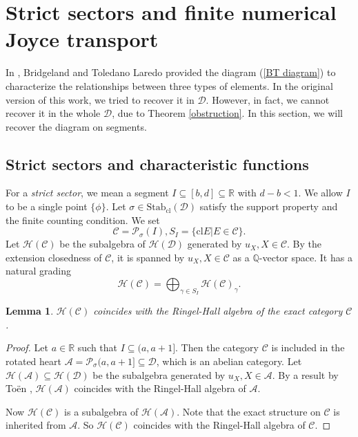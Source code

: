\documentclass[a4paper,12pt]{amsart}
\numberwithin{equation}{section}
\newtheorem{lemma}[theorem]{Lemma}
\newcommand{\Stab}{\mathrm{Stab}}
\newcommand{\cl}{\mathrm{cl}}
\newcommand{\1}{\mathbf{1}}
\begin{document}
\section{Strict sectors and finite numerical Joyce transport}
In \cite{BT2012}, Bridgeland and Toledano Laredo provided the diagram (\ref{BT diagram}) to characterize the relationships between three types of elements. In the original version \cite{GX2025} of this work, we tried to recover it in $\mathcal{D}$. However, in fact, we cannot recover it in the whole $\mathcal{D}$, due to Theorem \ref{obstruction}. In this section, we will recover the diagram on segments.
\subsection{Strict sectors and characteristic functions}
For a \emph{strict sector}, we mean a segment $I\subseteq[b,d]\subseteq\mathbb{R}$ with $d-b<1$. We allow $I$ to be a single point $\{\phi\}$. Let $\sigma\in\Stab_\cl(\mathcal{D})$ satisfy the support property and the finite counting condition. We set
\[\mathcal{C}=\mathcal{P}_\sigma(I),S_I=\{\cl E|E\in\mathcal{C}\}.\]
Let $\mathcal{H}(\mathcal{C})$ be the subalgebra of $\mathcal{H}(\mathcal{D})$ generated by $u_X,X\in\mathcal{C}$. By the extension closedness of  $\mathcal{C}$, it is spanned by $u_X,X\in\mathcal{C}$ as a $\mathbb{Q}$-vector space. It has a natural grading
\[\mathcal{H}(\mathcal{C})=\bigoplus_{\gamma\in S_I}\mathcal{H}(\mathcal{C})_\gamma.\]
\begin{lemma}\label{coincide Ringel-Hall}
    $\mathcal{H}(\mathcal{C})$ coincides with the Ringel-Hall algebra of the exact category $\mathcal{C}$.
\end{lemma}
\begin{proof}
    Let $a\in\mathbb{R}$ such that $I\subseteq(a,a+1]$. Then the category $\mathcal{C}$ is included in the rotated heart $\mathcal{A}=\mathcal{P}_\sigma(a,a+1]\subseteq\mathcal{D}$, which is an abelian category. Let $\mathcal{H}(\mathcal{A})\subseteq\mathcal{H}(\mathcal{D})$ be the subalgebra generated by $u_X,X\in\mathcal{A}$. By a result by To\"en \cite[Proposition 6.1]{Toe2006}, $\mathcal{H}(\mathcal{A})$ coincides with the Ringel-Hall algebra of $\mathcal{A}$.
    
    Now $\mathcal{H}(\mathcal{C})$ is a subalgebra of $\mathcal{H}(\mathcal{A})$. Note that the exact structure on $\mathcal{C}$ is inherited from $\mathcal{A}$. So $\mathcal{H}(\mathcal{C})$ coincides with the Ringel-Hall algebra of $\mathcal{C}$.
\end{proof}
\end{document}
